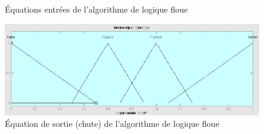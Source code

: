 \documentclass[12pt,letterpaper]{article}
\begin{document}
\begin{figure}
    \centering
    \quad
    
        
    \caption{Équations entrées de l'algorithme de logique floue}
    \label{fig:f_input}
\end{figure}

\begin{figure}
\centering
\includegraphics[scale=0.2]{images/f_chute.png}
\caption{Équation de sortie (chute) de l'algorithme de logique floue}
\label{fig:f_output}
\end{figure}
\end{document}
